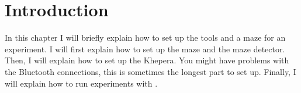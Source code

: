 \section{Introduction}
\label{sec:howto:intro}

In this chapter I will briefly explain how to set up the tools and a 
maze for an experiment. I will first explain how to set up the maze 
and the maze detector. Then, I will explain how to set up the Khepera. 
You might have problems with the Bluetooth connections, this is 
sometimes the longest part to set up. Finally, I will explain how to 
run experiments with \clsquare{}.
